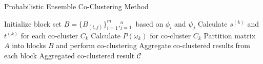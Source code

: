 \begin{algorithm}[!t]
    \caption{Probabilistic Ensemble Co-Clustering Method}\label{alg:method}
    \begin{algorithmic}[1]
        \STATE Initialize block set $B = \{B_{(i,j)}\}_{i=1}^m,_{j=1}^n$ based on $\phi_i$ and $\psi_j$
        \STATE Calculate $s^{(k)}$ and $t^{(k)}$ for each co-cluster $C_k$
            \STATE Calculate $P(\omega_k)$ for co-cluster $C_k$
                \STATE Partition matrix $A$ into blocks $B$ and perform co-clustering
                \STATE Aggregate co-clustered results from each block
            \ENDIF
        \ENDFOR
        \RETURN Aggregated co-clustered result $\mathcal{C}$
    \end{algorithmic}
\end{algorithm}